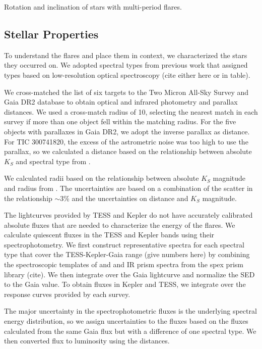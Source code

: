 \documentclass[fleqn,usenatbib,letters]{mnras}%
\newcommand{\FF}{TIC 300741820} %
\begin{document}
\begin{table}
\centering
\caption{Rotation and inclination of stars with multi-period flares.}
\label{tab:geometry}

\end{table}
\subsection{Stellar Properties}
\label{sec:props}
To understand the flares and place them in context, we characterized the stars they occurred on. We adopted spectral types from previous work that assigned types based on low-resolution optical spectroscopy (cite either here or in table).

We cross-matched the list of six targets to the Two Micron All-Sky Survey \citep[2MASS;][]{Skrutskie2006} and Gaia \citep{gaiacollaboration2016} DR2 database \citep{gaiacollaboration2018} to obtain optical and infrared photometry and parallax distances. We used a cross-match radius of 10\arcsec, selecting the nearest match in each survey if more than one object fell within the matching radius. For the five objects with parallaxes in Gaia DR2, we adopt the inverse parallax as distance. For \FF, the excess of the astrometric noise was too high to use the parallax, so we calculated a distance based on the relationship between absolute $K_S$ and spectral type from \citet{dupuy2012}.

We calculated radii based on the relationship between absolute $K_S$ magnitude and radius from \citet{Mann2015}. The uncertainties are based on a combination of the scatter in the relationship $\sim3$\% and the uncertainties on distance and $K_S$ magnitude.

The lightcurves provided by TESS and Kepler do not have accurately calibrated absolute fluxes that are needed to characterize the energy of the flares. We calculate quiescent fluxes in the TESS and Kepler bands using their spectrophotometry. We first construct representative spectra for each spectral type that cover the TESS-Kepler-Gaia range (give numbers here) by combining the spectroscopic templates of \citet{Bochanski2007} and \citet{Schmidt2014a} and IR prism spectra from the spex prism library (cite). We then integrate over the Gaia lightcurve and normalize the SED to the Gaia value. To obtain fluxes in Kepler and TESS, we integrate over the response curves provided by each survey.

The major uncertainty in the spectrophotometric fluxes is the underlying spectral energy distribution, so we assign uncertainties to the fluxes based on the fluxes calculated from the same Gaia flux but with a difference of one spectral type. We then converted flux to luminosity using the distances.
\end{document}
